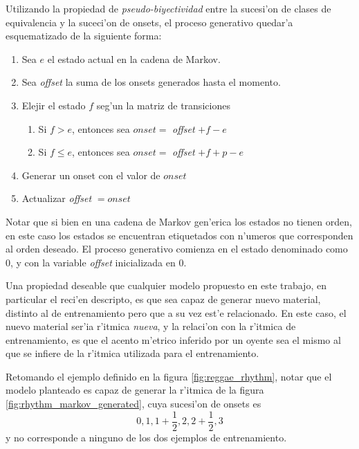 Utilizando la propiedad de \emph{pseudo-biyectividad} entre la sucesi'on de clases de equivalencia y la suceci'on de onsets, 
el proceso generativo quedar'a esquematizado de la siguiente forma:

\begin{enumerate}
  \item Sea $e$ el estado actual en la cadena de Markov. 
  \item Sea \emph{offset} la suma de los onsets generados hasta el momento. 
  \item Elejir el estado $f$ seg'un la matriz de transiciones
  \begin{enumerate}
    \item Si $f > e$, entonces sea $onset=$ \emph{offset} $+ f-e$
    \item Si $f \leq e$, entonces sea $onset=$ \emph{offset} $+ f + p - e$
  \end{enumerate}
  \item Generar un onset con el valor de $onset$
  \item Actualizar \emph{offset} $= onset$
\end{enumerate}

Notar que si bien en una cadena de Markov gen'erica los estados no tienen orden, en este caso los estados se encuentran etiquetados con n'umeros que 
corresponden al orden deseado.
El proceso generativo comienza en el estado denominado como $0$, y con la variable \emph{offset} inicializada en $0$.\newline

Una propiedad deseable que cualquier modelo propuesto en este trabajo, en particular el reci'en descripto, es que sea capaz de generar nuevo material, distinto al de entrenamiento
pero que a su vez est'e relacionado. En este caso, el nuevo material ser'ia r'itmica \emph{nueva}, y la relaci'on con la r'itmica de entrenamiento, es que el acento m'etrico inferido por un oyente 
sea el mismo al que se infiere de la r'itmica utilizada para el entrenamiento. 

Retomando el ejemplo definido en la figura \ref{fig:reggae_rhythm}, notar que el modelo planteado es capaz de generar la r'itmica de la figura 
\ref{fig:rhythm_markov_generated}, cuya sucesi'on de onsets es 
$$0, 1, 1+\frac{1}{2}, 2, 2+\frac{1}{2}, 3$$
y no corresponde a ninguno de los dos ejemplos de entrenamiento.

\begin{imagen}
\end{imagen}


